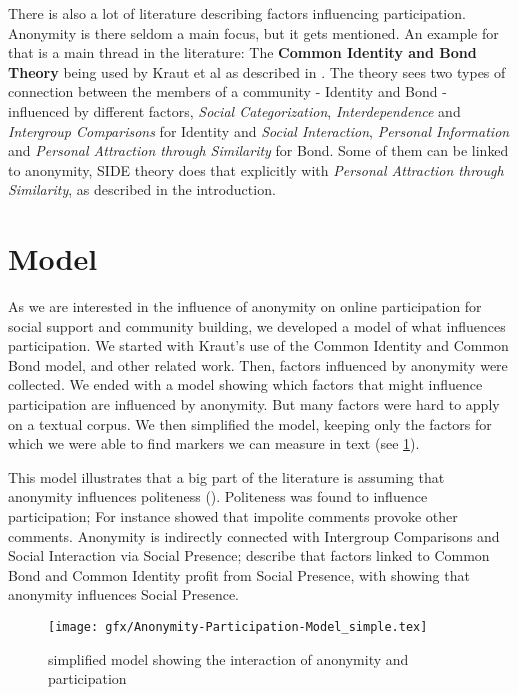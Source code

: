 \documentclass{chi-ext2}
\begin{document}
There is also a lot of literature describing factors influencing participation. Anonymity is there seldom a main focus, but it gets mentioned. An example for that is a main thread in the literature: The \textbf{Common Identity and Bond Theory} being used by Kraut et al as described in \cite{commonBond}. The theory sees two types of connection between the members of a community - Identity and Bond - influenced by different factors, \emph{Social Categorization}, \emph{Interdependence} and \emph{Intergroup Comparisons} for Identity and \emph{Social Interaction}, \emph{Personal Information} and \emph{Personal Attraction through Similarity} for Bond. Some of them can be linked to anonymity, SIDE theory does that explicitly with \emph{Personal Attraction through Similarity}, as described in the introduction.

\section{Model}
As we are interested in the influence of anonymity on online participation for social support and community building, we developed a model of what influences participation. We started with Kraut's use of the Common Identity and Common Bond model, and other related work. Then, factors influenced by anonymity were collected. We ended with a model showing which factors that might influence participation are influenced by anonymity. But many factors were hard to apply on a textual corpus. We then simplified the model, keeping only the factors for which we were able to find markers we can measure in text (see \ref{fig:model}). 

This model illustrates that a big part of the literature is assuming that anonymity influences politeness (\cite{offensiveInternet}). Politeness was found to influence participation; For instance \cite{bbcNegative} showed that impolite comments provoke other comments. Anonymity is indirectly connected with Intergroup Comparisons and Social Interaction via Social Presence; \cite{socialPresence} describe that factors linked to Common Bond and Common Identity profit from Social Presence, with \cite{anonPresence} showing that anonymity influences Social Presence.

\begin{figure}
    \centering
    \centerline{\texttt{[image: gfx/Anonymity-Participation-Model\_simple.tex]}}
    \caption{simplified model showing the interaction of anonymity and participation}
    \label{fig:model}
\end{figure}
\end{document}
